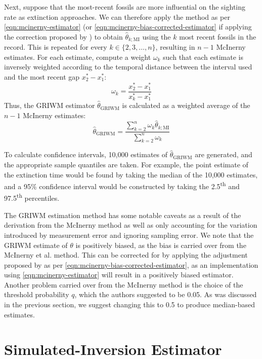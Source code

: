 Next, suppose that the most-recent fossils are more influential on the sighting rate as extinction approaches. We can therefore apply the \citet{Mcinerny2006} method as per \autoref{eqn:mcinerny-estimator} (or \autoref{eqn:mcinerny-bias-corrected-estimator} if applying the correction proposed by \citet{Huang2019}) to obtain $\hat\theta_{k; \text{MI}}$ using the $k$ most recent fossils in the record. This is repeated for every $k \in \{2, 3, \dots, n\}$, resulting in $n-1$ McInerny estimates. For each estimate, compute a weight $\omega_k$ such that each estimate is inversely weighted according to the temporal distance between the interval used and the most recent gap $x^*_{2} - x^*_{1}$: \[
\omega_k = \frac{x^*_{2} - x^*_{1}}{x^*_{k} - x^*_{1}}
\]
Thus, the GRIWM estimator $\hat\theta_{\text{GRIWM}}$ is calculated as a weighted average of the $n-1$ McInerny estimates:\begin{equation}\label{eq:griwm1}
    \hat\theta_{\text{GRIWM}} = \frac{\sum_{k=2}^{n} \omega_k \hat\theta_{k; \text{MI}}}{\sum_{k=2}^{n} \omega_k}
\end{equation}

To calculate confidence intervals, 10,000 estimates of $\hat\theta_{\text{GRIWM}}$ are generated, and the appropriate sample quantiles are taken. For example, the point estimate of the extinction time would be found by taking the median of the 10,000 estimates, and a 95\% confidence interval would be constructed by taking the 2.5\textsuperscript{th} and 97.5\textsuperscript{th} percentiles.

The GRIWM estimation method has some notable caveats as a result of the derivation from the McInerny method as well as only accounting for the variation introduced by measurement error and ignoring sampling error. We note that the GRIWM estimate of $\theta$ is positively biased, as the bias is carried over from the McInerny et al. method. This can be corrected for by applying the adjustment proposed by \citet{Huang2019} as per \autoref{eqn:mcinerny-bias-corrected-estimator}, as an implementation using \autoref{eqn:mcinerny-estimator} will result in a positively biased estimator. Another problem carried over from the McInerny method is the choice of the threshold probability $q$, which the authors suggested to be 0.05. As was discussed in the previous section, we suggest changing this to 0.5 to produce median-based estimates.

\section{Simulated-Inversion Estimator}

